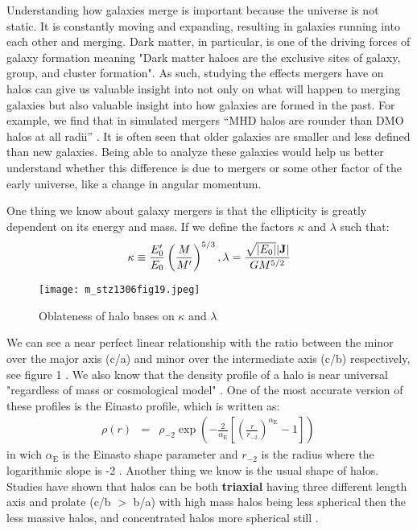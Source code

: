 \documentclass[fleqn,usenatbib]{mnras}
\begin{document}
Understanding how galaxies merge is important because the universe is not static. It is constantly moving and expanding, resulting in galaxies running into each other and merging. Dark matter, in particular, is one of the driving forces of galaxy formation meaning "Dark matter haloes are the exclusive sites of galaxy, group, and cluster formation"\cite{10.1093/mnras/stz1306}. As such, studying the effects mergers have on halos  can give us valuable insight into not only on what will happen to merging galaxies but also valuable insight into how  galaxies are formed in the past. For example, we find that in simulated mergers “MHD halos are rounder than DMO halos at all radii” \cite{10.1093/mnras/stz2873}. It is often seen that older galaxies are smaller and less defined than new galaxies. Being able to analyze these galaxies would help us better understand whether this difference is due to mergers or some other factor of the early universe, like a change in angular momentum. 

One thing we know about galaxy mergers is that the ellipticity is greatly dependent on its energy and mass. If we define the factors $\kappa $ and $\lambda$ such that:
\begin{eqnarray*}
\kappa \equiv \frac{E_0^{\prime }}{E_0} \left(\frac{M}{M^{\prime }} \right)^{5/3}, 
\lambda = \frac{\sqrt{|E_0|}|{\bf J}|}{GM^{5/2}} 
\end{eqnarray*}
\begin{figure}
    \centering
    \texttt{[image: m\_stz1306fig19.jpeg]}
    \caption{Oblateness of halo bases on $\kappa $ and  $\lambda $}
    \label{fig:enter-label}
\end{figure}
We can see a near perfect linear relationship with the ratio between the minor over the major axis (c/a) and minor over the intermediate axis (c/b) respectively, see figure 1 \cite{10.1093/mnras/stz1306}. 
We also know that the density profile of a halo is near universal "regardless of mass or cosmological model" \cite{10.1093/mnras/stz1307}. One of the most accurate version of these profiles is the Einasto profile, which is written as:
\begin{eqnarray*}
\rho (r) &=& \rho _{-2} \exp \left(-\frac{2}{\alpha _\mathrm{ E}}\left[\left(\frac{r}{r_{-2}}\right)^{\alpha _\mathrm{ E}} - 1 \right]\right) \, 
\end{eqnarray*}
in wich $\alpha _\mathrm{ E}$ is the Einasto shape parameter and ${r_{-2}}$ is the radius where the logarithmic slope is -2 \cite{10.1093/mnras/stz1307}. 
Another thing we know is the usual shape of halos. Studies have shown that halos can be both \textbf{triaxial} having three different length axis and prolate (c/b $>$ b/a) with high mass halos being less spherical then the less massive halos, and concentrated halos more spherical still \cite{10.1093/mnras/sty3531}.
\end{document}
